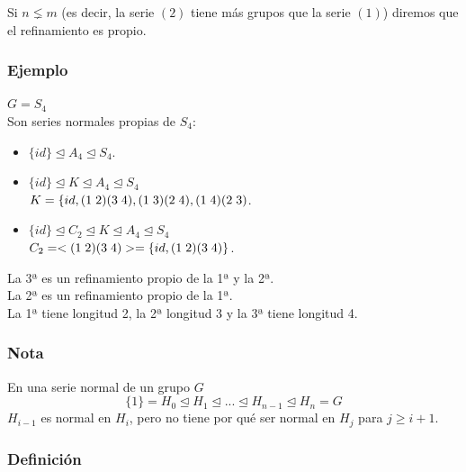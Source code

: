 \documentclass[11pt,a4paper]{article}
\begin{document}
Si $n \lneq m$ (es decir, la serie $(2)$ tiene más grupos que la serie $(1)$) diremos que el refinamiento es propio.

\subsubsection*{Ejemplo}

$G = S_{4}$ \\
Son series normales propias de $S_{4}$:
\begin{itemize}
\item $\{id\} \unlhd A_{4} \unlhd S_{4}$.
\item $\{id\} \unlhd K \unlhd A_{4} \unlhd S_{4}$ \\
$K = \{id, (1 \hspace{0.1cm} 2) (3 \hspace{0.1cm} 4), (1 \hspace{0.1cm} 3) (2 \hspace{0.1cm} 4), (1 \hspace{0.1cm} 4) (2 \hspace{0.1cm} 3)$.
\item $\{id\} \unlhd C_{2} \unlhd K \unlhd A_{4} \unlhd S_{4}$ \\
$C_{2} = <(1 \hspace{0.1cm} 2) (3 \hspace{0.1cm} 4)> = \{id, (1 \hspace{0.1cm} 2) (3 \hspace{0.1cm} 4)\}$.
\end{itemize}

La 3ª es un refinamiento propio de la 1ª y la 2ª. \\
La 2ª es un refinamiento propio de la 1ª. \\
La 1ª tiene longitud 2, la 2ª longitud 3 y la 3ª tiene longitud 4.

\subsubsection*{Nota}

En una serie normal de un grupo $G$
$$\{1\} = H_{0} \unlhd H_{1} \unlhd ... \unlhd H_{n-1} \unlhd H_{n} = G$$
$H_{i-1}$ es normal en $H_{i}$, pero no tiene por qué ser normal en $H_{j}$ para $j \geq i+1$.

\subsubsection*{Definición}
\end{document}
